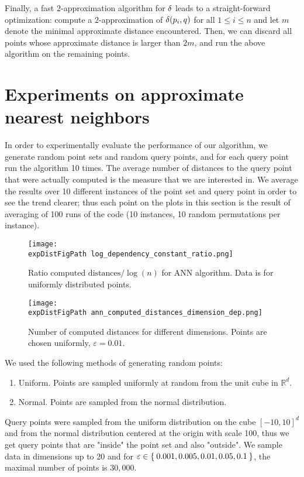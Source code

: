 \documentclass[]{ws-ijcga}
\renewcommand{\leq}{\leqslant}
\newcommand{\eps}{\varepsilon}
\newcommand{\RR}{\mathbb{R}}
\def \expDistFigPath {pics/}
\begin{document}
Finally, a fast $2$-approximation algorithm for $\delta$ leads to a straight-forward
optimization: compute a $2$-approximation of $\delta(p_i,q)$ for all $1\leq i\leq n$
and let $m$ denote the minimal approximate distance encountered. Then, we can discard all points
whose approximate distance is larger than $2m$, and run the above algorithm on the remaining points.



\section{Experiments on approximate nearest neighbors}
\label{sec:experiment_ann}

In order to experimentally evaluate the performance of our algorithm,
we generate random point sets and random query points, and for each query point
run the algorithm 10 times. The average number of distances to the query point
that were actually computed is the measure that we are interested in.
We average the results over 10 different instances of the point
set and query point in order to see the trend clearer; thus
each point on the plots in this section is the result of averaging of 100 runs
of the code (10 instances, 10 random permutations per instance).

\begin{figure}[ht]
    \begin{minipage}{0.45\textwidth}
        \texttt{[image: \\expDistFigPath log\_dependency\_constant\_ratio.png]}
        \caption{Ratio $\mbox{computed distances} / \log(n)$ for ANN algorithm. Data is for uniformly distributed
        points.}
        \label{fig:ann_const_ratio}
    \end{minipage}
    \begin{minipage}{0.45\textwidth}
        \texttt{[image: \\expDistFigPath ann\_computed\_distances\_dimension\_dep.png]}
        \caption{Number of computed distances for different dimensions. Points are chosen uniformly, $\eps = 0.01$.}
        \label{fig:ann_dimension_dependence}
    \end{minipage}
\end{figure}


We used the following methods of generating random points:
\begin{enumerate}
    \item Uniform. Points are sampled uniformly at random from the unit cube in $\RR^d$.
    \item Normal. Points are sampled from the normal distribution.
\end{enumerate}
Query points were sampled from the uniform distribution on the cube $[-10, 10]^d$
and from the normal distribution centered at the origin with scale 100,
thus we get query points that are "inside" the point set and also "outside".
We sample data in dimensions up to 20 and for $\eps \in \Set{0.001, 0.005, 0.01, 0.05, 0.1}$,
the maximal number of points is $30,000$.
\end{document}

